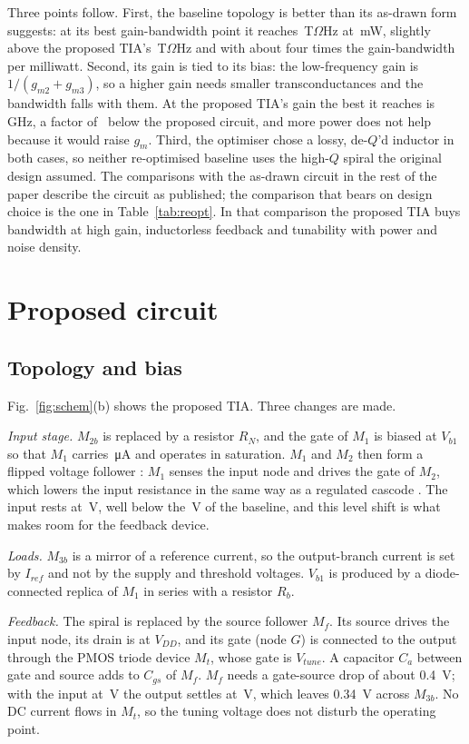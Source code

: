 \documentclass[11pt,a4paper]{article}
\begin{document}
Three points follow. First, the baseline topology is better than its as-drawn form suggests: at its best gain-bandwidth point it reaches \RbGbw\,T$\Omega$Hz at \RbPow\,mW, slightly above the proposed TIA's \PGbw\,T$\Omega$Hz and with about four times the gain-bandwidth per milliwatt. Second, its gain is tied to its bias: the low-frequency gain is $1/(g_{m2}+g_{m3})$, so a higher gain needs smaller transconductances and the bandwidth falls with them. At the proposed TIA's gain the best it reaches is \RgBw\,GHz, a factor of \BwRatioGain\ below the proposed circuit, and more power does not help because it would raise $g_m$. Third, the optimiser chose a lossy, de-$Q$'d inductor in both cases, so neither re-optimised baseline uses the high-$Q$ spiral the original design assumed. The comparisons with the as-drawn circuit in the rest of the paper describe the circuit as published; the comparison that bears on design choice is the one in Table~\ref{tab:reopt}. In that comparison the proposed TIA buys bandwidth at high gain, inductorless feedback and tunability with power and noise density.

\section{Proposed circuit}\label{sec:proposed}
\subsection{Topology and bias}
Fig.~\ref{fig:schem}(b) shows the proposed TIA. Three changes are made.

\emph{Input stage.} $M_{2b}$ is replaced by a resistor $R_N$, and the gate of $M_1$ is biased at $V_{b1}$ so that $M_1$ carries \IOne\,\si{\micro A} and operates in saturation. $M_1$ and $M_2$ then form a flipped voltage follower \cite{fvf}: $M_1$ senses the input node and drives the gate of $M_2$, which lowers the input resistance in the same way as a regulated cascode \cite{park}. The input rests at \Vin\,V, well below the \BVin\,V of the baseline, and this level shift is what makes room for the feedback device.

\emph{Loads.} $M_{3b}$ is a mirror of a reference current, so the output-branch current is set by $I_{ref}$ and not by the supply and threshold voltages. $V_{b1}$ is produced by a diode-connected replica of $M_1$ in series with a resistor $R_b$.

\emph{Feedback.} The spiral is replaced by the source follower $M_f$. Its source drives the input node, its drain is at $V_{DD}$, and its gate (node $G$) is connected to the output through the PMOS triode device $M_t$, whose gate is $V_{tune}$. A capacitor $C_a$ between gate and source adds to $C_{gs}$ of $M_f$. $M_f$ needs a gate-source drop of about \SI{0.4}{V}; with the input at \Vin\,V the output settles at \Vout\,V, which leaves \SI{0.34}{V} across $M_{3b}$. No DC current flows in $M_t$, so the tuning voltage does not disturb the operating point.
\end{document}
